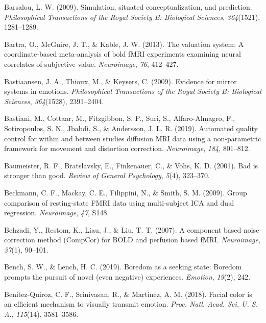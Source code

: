 \documentclass[11pt,american,a4paper,oneside,]{memoir} %
\begin{document}
\leavevmode\hypertarget{ref-barsalou2009simulation}{}%
Barsalou, L. W. (2009). Simulation, situated conceptualization, and prediction. \emph{Philosophical Transactions of the Royal Society B: Biological Sciences}, \emph{364}(1521), 1281--1289.

\leavevmode\hypertarget{ref-bartra2013valuation}{}%
Bartra, O., McGuire, J. T., \& Kable, J. W. (2013). The valuation system: A coordinate-based meta-analysis of bold fMRI experiments examining neural correlates of subjective value. \emph{Neuroimage}, \emph{76}, 412--427.

\leavevmode\hypertarget{ref-bastiaansen2009evidence}{}%
Bastiaansen, J. A., Thioux, M., \& Keysers, C. (2009). Evidence for mirror systems in emotions. \emph{Philosophical Transactions of the Royal Society B: Biological Sciences}, \emph{364}(1528), 2391--2404.

\leavevmode\hypertarget{ref-Bastiani2019-sm}{}%
Bastiani, M., Cottaar, M., Fitzgibbon, S. P., Suri, S., Alfaro-Almagro, F., Sotiropoulos, S. N., Jbabdi, S., \& Andersson, J. L. R. (2019). Automated quality control for within and between studies diffusion MRI data using a non-parametric framework for movement and distortion correction. \emph{Neuroimage}, \emph{184}, 801--812.

\leavevmode\hypertarget{ref-baumeister2001bad}{}%
Baumeister, R. F., Bratslavsky, E., Finkenauer, C., \& Vohs, K. D. (2001). Bad is stronger than good. \emph{Review of General Psychology}, \emph{5}(4), 323--370.

\leavevmode\hypertarget{ref-Beckmann2009-rs}{}%
Beckmann, C. F., Mackay, C. E., Filippini, N., \& Smith, S. M. (2009). Group comparison of resting-state FMRI data using multi-subject ICA and dual regression. \emph{Neuroimage}, \emph{47}, S148.

\leavevmode\hypertarget{ref-Behzadi2007-eb}{}%
Behzadi, Y., Restom, K., Liau, J., \& Liu, T. T. (2007). A component based noise correction method (CompCor) for BOLD and perfusion based fMRI. \emph{Neuroimage}, \emph{37}(1), 90--101.

\leavevmode\hypertarget{ref-bench2019boredom}{}%
Bench, S. W., \& Lench, H. C. (2019). Boredom as a seeking state: Boredom prompts the pursuit of novel (even negative) experiences. \emph{Emotion}, \emph{19}(2), 242.

\leavevmode\hypertarget{ref-Benitez-Quiroz2018-vr}{}%
Benitez-Quiroz, C. F., Srinivasan, R., \& Martinez, A. M. (2018). Facial color is an efficient mechanism to visually transmit emotion. \emph{Proc. Natl. Acad. Sci. U. S. A.}, \emph{115}(14), 3581--3586.
\end{document}
